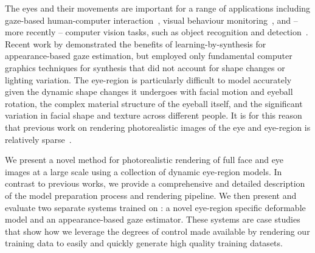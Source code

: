 The eyes and their movements are important for a range of applications including gaze-based human-computer interaction~\cite{majaranta14_apc}, visual behaviour monitoring~\cite{bulling13_chi,bulling11_pami}, and -- more recently -- computer vision tasks, such as object recognition and detection~\cite{yun2013studying,papadopoulos2014training,karthikeyan2013and}.
Recent work by \citet{sugano2014learning} demonstrated the benefits of learning-by-synthesis for appearance-based gaze estimation, but employed only fundamental computer graphics techniques for synthesis that did not account for shape changes or lighting variation.
The eye-region is particularly difficult to model accurately given the dynamic shape changes it undergoes with facial motion and eyeball rotation, the complex material structure of the eyeball itself, and the significant variation in facial shape and texture across different people.
It is for this reason that previous work on rendering photorealistic images of the eye and eye-region is relatively sparse~\cite{ActiBlizEyes,berard2014highquality}.





We present a novel method for photorealistic rendering of full face and eye images at a large scale using a collection of dynamic eye-region models.
In contrast to previous works, we provide a comprehensive and detailed description of the model preparation process and rendering pipeline.
We then present and evaluate two separate systems trained on \dataset: a novel eye-region specific deformable model and an appearance-based gaze estimator.
These systems are case studies that show how we leverage the degrees of control made available by rendering our training data to easily and quickly generate high quality training datasets.

